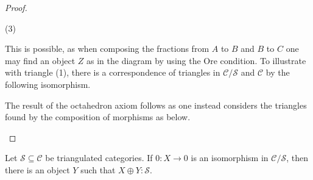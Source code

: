 \begin{proof}
\begin{center}
            (3)
        \end{center}
        This is possible, as when composing the fractions from $A$ to $B$ and $B$ to $C$ one may find an object $Z$ as in the diagram by using the Ore condition. To illustrate with triangle (1), there is a correspondence of triangles in $\mathcal{C}/\mathcal{S}$ and $\mathcal{C}$ by the following isomorphism.
        \begin{center}
        \end{center}
        The result of the octahedron axiom follows as one instead considers the triangles found by the composition of morphisms as below.
        \begin{center}
        \end{center}
    \end{proof}

    \begin{prop}
        Let $\mathcal{S}\subseteq\mathcal{C}$ be triangulated categories. If $0:X\rightarrow 0$ is an isomorphism in $\mathcal{C}/\mathcal{S}$, then there is an object $Y$ such that $X\oplus Y:\mathcal{S}$.
    \end{prop}

